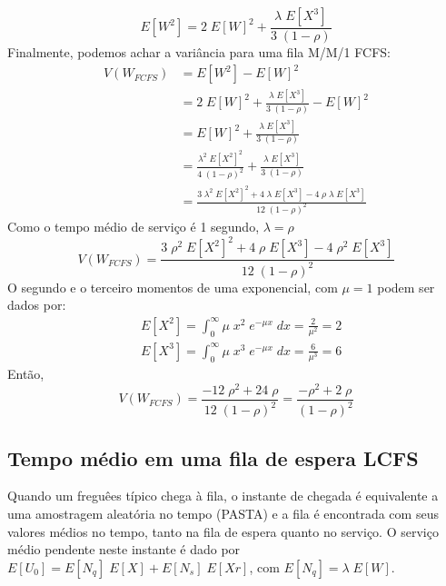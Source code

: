 \documentclass[a4paper]{article}
\newcommand{\E}[1]{E\!\left[#1\right]}
\begin{document}
\[
    \E{W^2}
    = 2 \; \E{W}^2 + \frac{\lambda \; \E{X^3}}{3 \; (1 - \rho)}
\]
Finalmente, podemos achar a variância para uma fila M/M/1 FCFS:
\begin{align*}
    V(W_{FCFS}) &= \E{W^2} - \E{W}^2 \\
    &= 2 \; \E{W}^2 + \frac{\lambda \; \E{X^3}}{3 \; (1 - \rho)}
        - \E{W}^2 \\
    &= \E{W}^2 + \frac{\lambda \; \E{X^3}}{3 \; (1 - \rho)} \\
    &= \frac{\lambda^2 \; \E{X^2}^2}{4 \; (1 - \rho)^2}
        + \frac{\lambda \; \E{X^3}}{3 \; (1 - \rho)} \\
    &= \frac{3 \; \lambda^2 \; \E{X^2}^2 + 4 \; \lambda \; \E{X^3}
        - 4 \; \rho \; \lambda \; \E{X^3}}{12 \; (1 - \rho)^2}
    \end{align*}
Como o tempo médio de serviço é 1 segundo, \(\lambda = \rho\)
\[
    V(W_{FCFS}) = \frac{3 \; \rho^2 \; \E{X^2}^2
        + 4 \; \rho \; \E{X^3} - 4 \; \rho^2 \; \E{X^3}}{12
        \; (1 - \rho)^2}
\]
O segundo e o terceiro momentos de uma exponencial,
com \(\mu = 1\) podem ser dados por:
\begin{align*}
    &\E{X^2} = \int_{0}^{\infty} \mu \;x^2\;e^{-\mu x}\;dx= \frac{2}{\mu^2 } = 2 \\
    &\E{X^3} = \int_{0}^{\infty} \mu \;x^3\;e^{-\mu x}\;dx = \frac{6}{\mu^3 } = 6
\end{align*}
Então,
\[
    V(W_{FCFS})
    = \frac{-12 \; \rho^2 + 24 \; \rho}{12 \; (1 - \rho)^2} = \frac{-\rho^2 + 2 \; \rho}{(1 - \rho)^2}
\]
\subsection{Tempo médio em uma fila de espera LCFS}
Quando um freguêes típico chega à fila, o instante de chegada
é equivalente a uma amostragem aleatória no tempo (PASTA)
e a fila  é encontrada com seus valores médios no tempo,
tanto na fila de espera quanto no serviço.
O serviço médio pendente neste instante  é dado
por \(\E{U_0} = \E{N_q}\;\E{X} + \E{N_s}\;\E{Xr}\), com \(\E{N_q} = \lambda\;\E{W}\).
\end{document}
